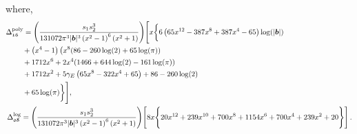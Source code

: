 where,
\begin{align}
    \begin{split}
    &\Delta_{\mathfrak{16}}^{\textrm{poly}}=\Bigg(\frac{s_1 s_2^3}{131072 \pi ^3 |\boldsymbol{b}|^3 \left(x^2-1\right)^6 \left(x^2+1\right)}\Bigg)\Bigg[x\bigg\{6 \left(65 x^{12}-387 x^8+387 x^4-65\right) \log (|\boldsymbol{b}|)\\ & \hspace{0.8cm}+\left(x^4-1\right) \big(x^8 (86-260 \log (2)+65 \log (\pi ))\\& \hspace{0.8cm}+1712 x^6+2 x^4 (1466+644 \log (2)-161 \log (\pi ))\\&\hspace{0.8cm}+1712 x^2+5 \gamma_E  \left(65 x^8-322 x^4+65\right)+86-260 \log (2)\\& \hspace{0.8cm}+65 \log (\pi )\bigg\}\Bigg], \\&\,\Delta_{\mathfrak{08}}^{\textrm{log}}=\Bigg(\frac{s_1 s_2^3}{131072 \pi ^3 |\boldsymbol{b}|^3 \left(x^2-1\right)^6 \left(x^2+1\right)}\Bigg)\Bigg[8 x\Bigg\{20 x^{12}+239 x^{10}+700 x^8+1154 x^6+700 x^4+239 x^2+20\Bigg\}\Bigg]\,.
    \end{split}
\end{align}
